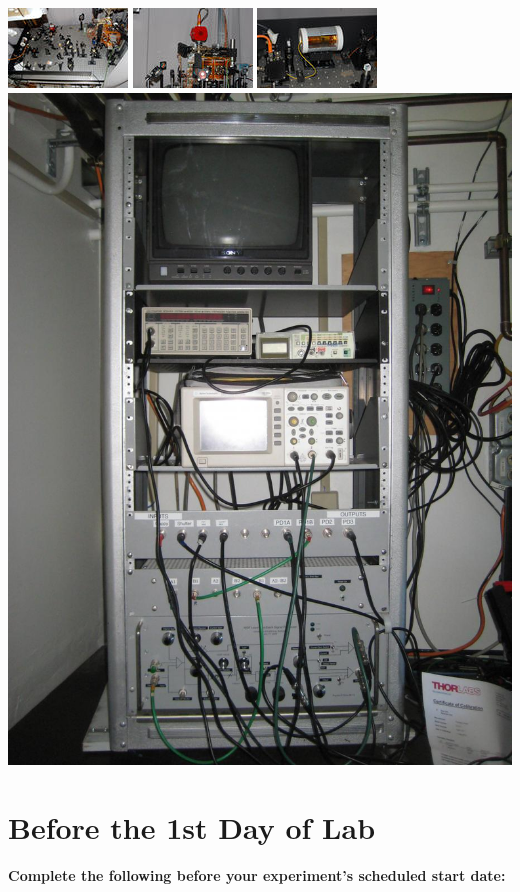 \documentclass{../lab}
\begin{document}
\noindent
\href{http://experimentationlab.berkeley.edu/sites/default/files/images/120px-MOT_318_t1.jpg}{\includegraphics[width=0.25\linewidth,keepaspectratio]{images/120px-MOT_318_t1.jpg}}
\href{http://experimentationlab.berkeley.edu/sites/default/files/images/120px-MOTChamber_284_t1.jpg}{\includegraphics[width=0.25\linewidth,keepaspectratio]{images/120px-MOTChamber_284_t1.jpg}}
\href{http://experimentationlab.berkeley.edu/sites/default/files/images/120px-DavLL_289_t1.jpg}{\includegraphics[width=0.25\linewidth,keepaspectratio]{images/120px-DavLL_289_t1.jpg}}
\href{http://experimentationlab.berkeley.edu/sites/default/files/IMG_4086.JPG}{\includegraphics[width=0.25\linewidth,keepaspectratio]{images/IMG_4086.JPG}}

\section{Before the 1st Day of Lab}

\textbf{Complete the following before your experiment's scheduled start date:}
\end{document}
